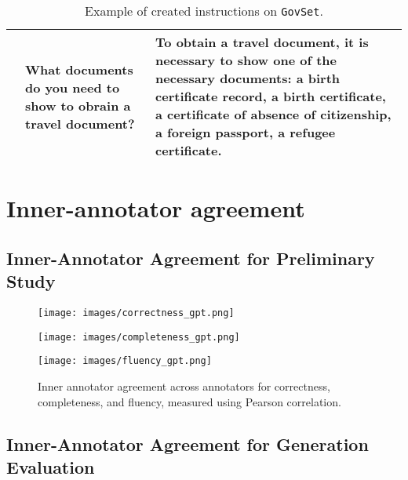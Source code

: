 \begin{table*}[ht!]
{\begin{tabular}{p{}p{}p{}}
 & What documents do you need to show to obrain a travel document? & To obtain a travel document, it is necessary to show one of the necessary documents: a birth certificate record, a birth certificate, a certificate of absence of citizenship, a foreign passport, a refugee certificate.  \\
\bottomrule
\end{tabular} }
\caption{Example of created instructions on \texttt{GovSet}.}
\label{tab:example_govset}
\end{table*}



\clearpage
\section{Inner-annotator agreement}
\label{app:inner-annot-appendix}
\subsection{Inner-Annotator Agreement for Preliminary Study}
\label{app:inner-annot-prelim}


\begin{figure*}[h!]
    \centering
    \begin{minipage}[b]{0.3\textwidth}
        \centering
        \texttt{[image: images/correctness\_gpt.png]}
    \end{minipage}
    \hfill
    \begin{minipage}[b]{0.3\textwidth}
        \centering
        \texttt{[image: images/completeness\_gpt.png]}
    \end{minipage}
    \hfill
    \begin{minipage}[b]{0.3\textwidth}
        \centering
        \texttt{[image: images/fluency\_gpt.png]} %
    \end{minipage}
    \caption{Inner annotator agreement across annotators for correctness, completeness, and fluency, measured using Pearson correlation.}

    \label{fig:inner-annotator-agreement}
\end{figure*}

\subsection{Inner-Annotator Agreement for Generation Evaluation}
\label{app:inner-annot-gen-eval}


